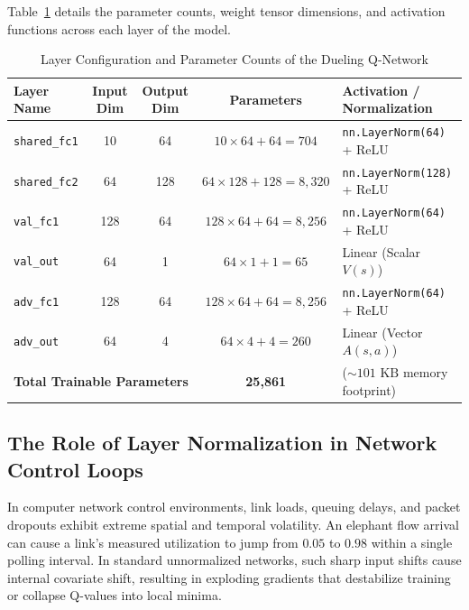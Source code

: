 \documentclass[12pt,a4paper,oneside]{report}
\begin{document}
Table~\ref{tab:layer_specifications} details the parameter counts, weight tensor dimensions, and activation functions across each layer of the model.

\begin{table}[htbp]
\centering
\caption{Layer Configuration and Parameter Counts of the Dueling Q-Network}
\label{tab:layer_specifications}
\small
\begin{tabularx}{\textwidth}{l c c c X}
\toprule
\textbf{Layer Name} & \textbf{Input Dim} & \textbf{Output Dim} & \textbf{Parameters} & \textbf{Activation / Normalization} \\
\midrule
\texttt{shared\_fc1} & 10 & 64 & $10 \times 64 + 64 = 704$ & \texttt{nn.LayerNorm(64)} + ReLU \\
\texttt{shared\_fc2} & 64 & 128 & $64 \times 128 + 128 = 8,320$ & \texttt{nn.LayerNorm(128)} + ReLU \\
\addlinespace
\texttt{val\_fc1} & 128 & 64 & $128 \times 64 + 64 = 8,256$ & \texttt{nn.LayerNorm(64)} + ReLU \\
\texttt{val\_out} & 64 & 1 & $64 \times 1 + 1 = 65$ & Linear (Scalar $V(s)$) \\
\addlinespace
\texttt{adv\_fc1} & 128 & 64 & $128 \times 64 + 64 = 8,256$ & \texttt{nn.LayerNorm(64)} + ReLU \\
\texttt{adv\_out} & 64 & 4 & $64 \times 4 + 4 = 260$ & Linear (Vector $A(s, a)$) \\
\midrule
\multicolumn{3}{l}{\textbf{Total Trainable Parameters}} & \textbf{25,861} & ($\sim 101\text{ KB}$ memory footprint) \\
\bottomrule
\end{tabularx}
\end{table}

\subsection{The Role of Layer Normalization in Network Control Loops}
In computer network control environments, link loads, queuing delays, and packet dropouts exhibit extreme spatial and temporal volatility. An elephant flow arrival can cause a link's measured utilization to jump from $0.05$ to $0.98$ within a single polling interval. In standard unnormalized networks, such sharp input shifts cause internal covariate shift, resulting in exploding gradients that destabilize training or collapse Q-values into local minima.
\end{document}
